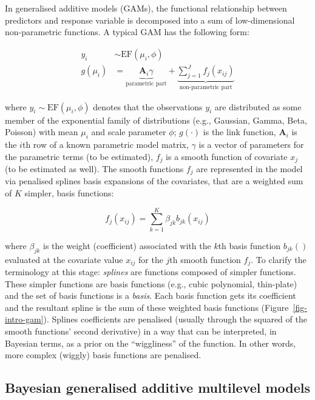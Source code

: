 \documentclass[
  doc,
  floatsintext,
  longtable,
  a4paper,
  nolmodern,
  notxfonts,
  notimes,
  donotrepeattitle,
  colorlinks=true,linkcolor=blue,citecolor=blue,urlcolor=blue]{apa7}
\begin{document}
In generalised additive models (GAMs), the functional relationship
between predictors and response variable is decomposed into a sum of
low-dimensional non-parametric functions. A typical GAM has the
following form:

\[
\begin{aligned} 
y_{i} &\sim \mathrm{EF}\left(\mu_{i}, \phi\right)\\
g\left(\mu_i\right) &= \underbrace{\mathbf{A}_{i} \gamma}_{\text{parametric part}} + \underbrace{\sum_{j=1}^{J} f_{j}\left(x_{ij}\right)}_{\text{non-parametric part}}
\end{aligned}
\]

where \(y_{i} \sim \mathrm{EF}\left(\mu_{i}, \phi\right)\) denotes that
the observations \(y_{i}\) are distributed as some member of the
exponential family of distributions (e.g., Gaussian, Gamma, Beta,
Poisson) with mean \(\mu_{i}\) and scale parameter \(\phi\);
\(g(\cdot)\) is the link function, \(\mathbf{A}_{i}\) is the \(i\)th row
of a known parametric model matrix, \(\gamma\) is a vector of parameters
for the parametric terms (to be estimated), \(f_{j}\) is a smooth
function of covariate \(x_{j}\) (to be estimated as well). The smooth
functions \(f_{j}\) are represented in the model via penalised splines
basis expansions of the covariates, that are a weighted sum of \(K\)
simpler, basis functions:

\[
f_{j}\left(x_{i j}\right) = \sum_{k=1}^K \beta_{jk} b_{jk}\left(x_{ij}\right)
\]

where \(\beta_{jk}\) is the weight (coefficient) associated with the
\(k\)th basis function \(b_{jk}()\) evaluated at the covariate value
\(x_{ij}\) for the \(j\)th smooth function \(f_{j}\). To clarify the
terminology at this stage: \emph{splines} are functions composed of
simpler functions. These simpler functions are basis functions (e.g.,
cubic polynomial, thin-plate) and the set of basis functions is a
\emph{basis}. Each basis function gets its coefficient and the resultant
spline is the sum of these weighted basis functions
(Figure~\ref{fig-intro-gam}). Splines coefficients are penalised
(usually through the squared of the smooth functions' second derivative)
in a way that can be interpreted, in Bayesian terms, as a prior on the
``wiggliness'' of the function. In other words, more complex (wiggly)
basis functions are penalised.

\subsection{Bayesian generalised additive multilevel
models}\label{bayesian-generalised-additive-multilevel-models}
\end{document}
